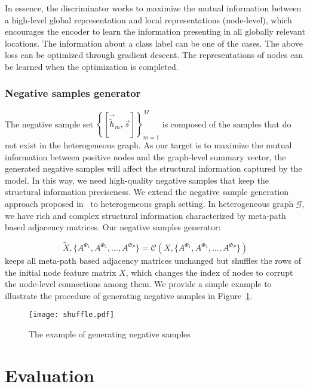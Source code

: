 \documentclass[conference]{IEEEtran}
\begin{document}
	In essence, the discriminator works to maximize the mutual information between a high-level global representation and local representations (node-level), which encourages the encoder to learn the information presenting in all globally relevant locations. The information about a class label can be one of the cases. The above loss can be optimized through gradient descent. The representations of nodes can be learned when the optimization is completed. 
	
\subsubsection{Negative samples generator}\label{sec:nsg}	
The negative sample set $\left\{[\vec{\tilde{h}}_m, \vec{s}]\right\}_{m=1}^M$ is composed of the samples that do not exist in the heterogeneous graph. As our target is to maximize the mutual information between positive nodes and the graph-level summary vector, the generated negative samples will affect the structural information captured by the model. In this way, we need high-quality negative samples that keep the structural information preciseness. We extend the negative sample generation approach proposed in~\cite{velivckovic2018deep} to heterogeneous graph setting. 
	In heterogeneous graph $\mathcal{G}$, we have rich and complex structural information characterized by meta-path based adjacency matrices. Our negative samples generator:
	
\begin{equation}
		\tilde{X},\{A^{\Phi_1},A^{\Phi_2},\dots,A^{\Phi_P}\} = \mathcal{C}(X,\{A^{\Phi_1},A^{\Phi_2},\dots,A^{\Phi_P}\})
		\label{eq:corrupt}
\end{equation}
keeps all meta-path based adjacency matrices unchanged but shuffles the rows of the initial node feature matrix $X$, which changes the index of nodes to corrupt the node-level connections among them. 
	We provide a simple example to illustrate the procedure of generating negative samples in Figure~\ref{fig:shuffle}.
\begin{figure}[t]
\centering
		\begin{minipage}[l]{1\columnwidth}
			\centering
			\texttt{[image: shuffle.pdf]}
		\end{minipage}
\caption{The example of generating negative samples}\label{fig:shuffle}
\end{figure}


	


	\section{Evaluation}\label{sec:real-eval}
\end{document}
